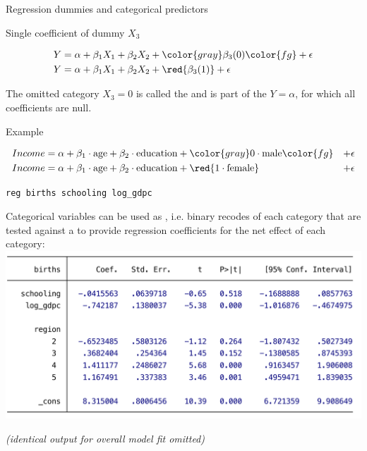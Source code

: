 \documentclass[t]{beamer}
\begin{document}
		\begin{frame}[t]{Regression dummies and categorical predictors}

			\begin{block}{Single coefficient of dummy $X_3$}

				\vspace{-1em}
				\begin{align*}
					Y &= \alpha + \beta_1 X_1 + \beta_2 X_2 + \color{gray} \beta_3 (0) \color{fg} + \epsilon \\
					Y &= \alpha + \beta_1 X_1 + \beta_2 X_2 + \red{\beta_3 (1)} + \epsilon
				\end{align*}

				The omitted category $X_3 = 0$ is called the  and is part of the  $Y = \alpha$, for which all coefficients are null.
				
			\end{block}
			
			\begin{exampleblock}{Example}

				\vspace{-1em}
				\begin{align*}			
					Income &= \alpha + \beta_1 \cdot \text{age} + \beta_2 \cdot \text{education} + \color{gray} 0 \cdot \text{male} \color{fg} & + \epsilon \\
					Income &= \alpha + \beta_1 \cdot \text{age} + \beta_2 \cdot \text{education} + \red{1 \cdot \text{female}} & + \epsilon
				\end{align*}

			\end{exampleblock}
			
		\end{frame}
					
	\begin{frame}[t]{\texttt{reg births schooling log\_gdpc }}

		Categorical variables can be used as , i.e. binary recodes of each category that are tested against a  to provide regression coefficients for the net effect of each category:\\[.5em]

		\includegraphics[scale=.45]{mreg-output-dummies.pdf}

		\footnotesize{\textit{(identical output for overall model fit omitted)}}

	\end{frame}
\end{document}
